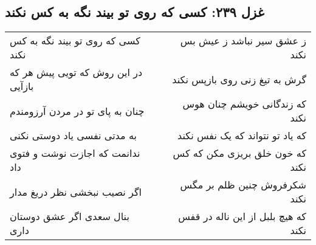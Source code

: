 \begin{center}
\section*{غزل ۲۳۹: کسی که روی تو بیند نگه به کس نکند}
\label{sec:239}
\begin{longtable}{l p{0.5cm} r}
کسی که روی تو بیند نگه به کس نکند
&&
ز عشق سیر نباشد ز عیش بس نکند
\\
در این روش که تویی پیش هر که بازآیی
&&
گرش به تیغ زنی روی بازپس نکند
\\
چنان به پای تو در مردن آرزومندم
&&
که زندگانی خویشم چنان هوس نکند
\\
به مدتی نفسی یاد دوستی نکنی
&&
که یاد تو نتواند که یک نفس نکند
\\
ندانمت که اجازت نوشت و فتوی داد
&&
که خون خلق بریزی مکن که کس نکند
\\
اگر نصیب نبخشی نظر دریغ مدار
&&
شکرفروش چنین ظلم بر مگس نکند
\\
بنال سعدی اگر عشق دوستان داری
&&
که هیچ بلبل از این ناله در قفس نکند
\\
\end{longtable}
\end{center}
